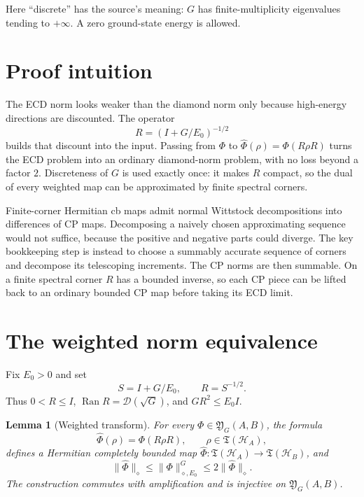 \documentclass[11pt]{article}
\newtheorem{lemma}[theorem]{Lemma}
\newcommand{\T}{\mathfrak T}
\newcommand{\Y}{\mathfrak Y}
\newcommand{\cH}{\mathcal H}
\newcommand{\Ran}{\operatorname{Ran}}
\begin{document}
Here ``discrete'' has the source's meaning: $G$ has finite-multiplicity
eigenvalues tending to $+\infty$.  A zero ground-state energy is allowed.

\section{Proof intuition}

The ECD norm looks weaker than the diamond norm only because high-energy
directions are discounted.  The operator
\[
 R=(I+G/E_0)^{-1/2}
\]
builds that discount into the input.  Passing from $\Phi$ to
$\widehat\Phi(\rho)=\Phi(R\rho R)$ turns the ECD problem into an ordinary
diamond-norm problem, with no loss beyond a factor $2$.  Discreteness of
$G$ is used exactly once: it makes $R$ compact, so the dual of every weighted
map can be approximated by finite spectral corners.

Finite-corner Hermitian cb maps admit normal Wittstock decompositions into
differences of CP maps.  Decomposing a naively chosen approximating sequence
would not suffice, because the positive and negative parts could diverge.
The key bookkeeping step is instead to choose a summably accurate sequence
of corners and decompose its telescoping increments.  The CP norms are then
summable.  On a finite spectral corner $R$ has a bounded inverse, so each CP
piece can be lifted back to an ordinary bounded CP map before taking its ECD
limit.

\section{The weighted norm equivalence}

Fix $E_0>0$ and set
\[
 S=I+G/E_0,\qquad R=S^{-1/2}.
\]
Thus $0<R\leq I$, $\Ran R=\mathcal D(\sqrt G)$, and
$GR^2\leq E_0I$.

\begin{lemma}[Weighted transform]\label{lem:weight}
For every $\Phi\in\Y_G(A,B)$, the formula
\[
 \widehat\Phi(\rho)=\Phi(R\rho R),\qquad \rho\in\T(\cH_A),
\]
defines a Hermitian completely bounded map
$\widehat\Phi:\T(\cH_A)\to\T(\cH_B)$, and
\begin{equation}\label{eq:norm-equivalence}
 \|\widehat\Phi\|_\diamond
 \leq \|\Phi\|_{\diamond,E_0}^{G}
 \leq 2\|\widehat\Phi\|_\diamond .
\end{equation}
The construction commutes with amplification and is injective on
$\Y_G(A,B)$.
\end{lemma}
\end{document}
